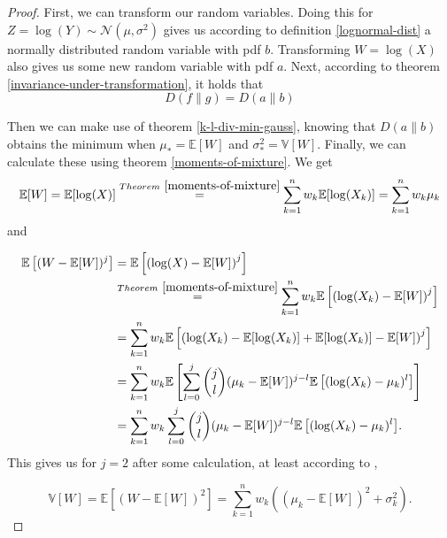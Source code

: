 \documentclass{article}
\begin{document}
\begin{proof}
First, we can transform our random variables. Doing this for $Z = \log(Y) \sim \mathcal{N}(\mu, \sigma^{2})$ gives us according to definition \ref{lognormal-dist} a normally distributed random variable with pdf $b$. Transforming $W = \log(X)$ also gives us some new random variable with pdf $a$. Next, according to theorem \ref{invariance-under-transformation}, it holds that 
\begin{equation}
    D(f \parallel g) = D(a \parallel b)
\end{equation}

Then we can make use of theorem \ref{k-l-div-min-gauss}, knowing that $D(a \parallel b)$ obtains the minimum when $\mu_{*} = \mathbb{E}[W]$ and $\sigma_{*}^{2} = \mathbb{V}[W]$. Finally, we can calculate these using theorem \ref{moments-of-mixture}. We get
\begin{equation}
    \mathbb{E}[W] = \mathbb{E}[\log(X)] \stackrel{Theorem\ \ref{moments-of-mixture}}{=} \sum_{k=1}^{n}{w_{k}\mathbb{E}[\log(X_{k})]} = \sum_{k=1}^{n}{w_{k}\mu_{k}}
\end{equation}
and 

\begin{align*}
    \mathbb{E}\left[(W-\mathbb{E}[W])^{j}\right] &= \mathbb{E}\left[\left(\log(X)-\mathbb{E}[W]\right)^{j}\right] \\
    &\stackrel{Theorem\ \ref{moments-of-mixture}}{=} \sum_{k=1}^{n}{w_{k}\mathbb{E}\left[\left(\log(X_{k})-\mathbb{E}[W]\right)^{j}\right] } \\
    &= \sum_{k=1}^{n}{w_{k}\mathbb{E}\left[\left(\log(X_{k}) - \mathbb{E}[\log(X_{k})] + \mathbb{E}[\log(X_{k})] -\mathbb{E}[W]\right)^{j}\right] }\\
    &= \sum_{k=1}^{n}{w_{k}\mathbb{E}\left[ \sum_{l=0}^{j} \binom{j}{l} (\mu_{k}- \mathbb{E}[W])^{j-l} \mathbb{E}\left[(\log(X_{k})-\mu_{k})^{l}\right]\right]} \\
    &= \sum_{k=1}^{n}{w_{k} \sum_{l=0}^{j} \binom{j}{l} (\mu_{k}- \mathbb{E}[W])^{j-l} \mathbb{E}\left[(\log(X_{k})-\mu_{k})^{l}\right]} \text{.}
\end{align*}
 This gives us for $j = 2$ after some calculation, at least according to \cite{mixture_distribution},
 
 \begin{equation}
     \mathbb{V}[W] = \mathbb{E}\left[(W-\mathbb{E}[W])^{2}\right] = \sum _{k=1}^{n}w_{k}((\mu _{k}-\mathbb{E}[W] )^{2}+\sigma _{k}^{2}) \text{.}
 \end{equation}
\end{proof}
\end{document}
